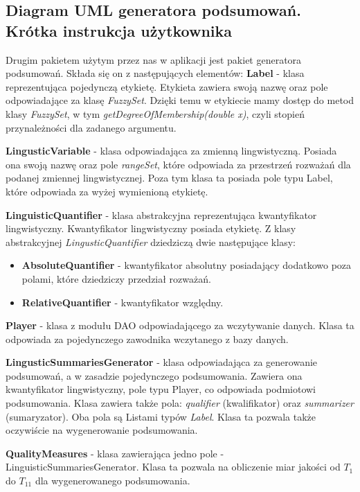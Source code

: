\documentclass{classrep}
\begin{document}
\subsection{Diagram UML generatora podsumowań. Krótka instrukcja użytkownika} 

Drugim pakietem użytym przez nas w aplikacji jest pakiet generatora podsumowań. Składa się on z następujących elementów:
{\bf Label} - klasa reprezentująca pojedynczą etykietę. Etykieta zawiera swoją nazwę oraz pole odpowiadające za klasę \textit{FuzzySet}. Dzięki temu w etykiecie mamy dostęp do metod klasy \textit{FuzzySet}, w tym \textit{getDegreeOfMembership(double x)}, czyli stopień przynależności dla zadanego argumentu.

{\bf LingusticVariable} - klasa odpowiadająca za zmienną lingwistyczną. Posiada ona swoją nazwę oraz pole \textit{rangeSet}, które odpowiada za przestrzeń rozważań dla podanej zmiennej lingwistycznej. Poza tym klasa ta posiada pole typu Label, które odpowiada za wyżej wymienioną etykietę.

{\bf LinguisticQuantifier} - klasa abstrakcyjna reprezentująca kwantyfikator lingwistyczny. Kwantyfikator lingwistyczny posiada etykietę. Z klasy abstrakcyjnej \textit{LingusticQuantifier} dziedziczą dwie następujące klasy:
\begin{itemize}
    \item {\bf AbsoluteQuantifier} - kwantyfikator absolutny posiadający dodatkowo poza polami, które dziedziczy przedział rozważań.
    \item {\bf RelativeQuantifier} - kwantyfikator względny.
\end{itemize}

{\bf Player} - klasa z modułu DAO odpowiadającego za wczytywanie danych. Klasa ta odpowiada za pojedynczego zawodnika wczytanego z bazy danych.

{\bf LingusticSummariesGenerator} - klasa odpowiadająca za generowanie podsumowań, a w zasadzie pojedynczego podsumowania. Zawiera ona kwantyfikator lingwistyczny, pole typu Player, co odpowiada podmiotowi podsumowania. Klasa zawiera także pola: \textit{qualifier} (kwalifikator) oraz \textit{summarizer} (sumaryzator). Oba pola są Listami typów \textit{Label}. Klasa ta pozwala także oczywiście na wygenerowanie podsumowania.

{\bf QualityMeasures} - klasa zawierająca jedno pole - LinguisticSummariesGenerator. Klasa ta pozwala na obliczenie miar jakości od $T_1$ do $T_{11}$ \cite{niewiadomski19} dla wygenerowanego podsumowania.
\end{document}
